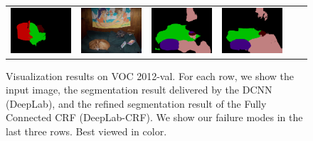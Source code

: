 \begin{figure}[!htbp]
{\begin{tabular}{c c c | c c c}
    \includegraphics[height=0.12\linewidth]{fig/res_crf/2007_000452.png} &
    \includegraphics[height=0.12\linewidth]{fig/img/2007_002268.jpg} &
    \includegraphics[height=0.12\linewidth]{fig/res_none/2007_002268.png} &
    \includegraphics[height=0.12\linewidth]{fig/res_crf/2007_002268.png} \\
  \end{tabular}
  }
  \caption{Visualization results on VOC 2012-val. For each row, we show the input image, the segmentation result delivered by the DCNN (DeepLab), and the refined segmentation result of the Fully Connected CRF (DeepLab-CRF). We show our failure modes in the last three rows. Best viewed in color.} 
  \label{fig:ValResults}
\end{figure}
